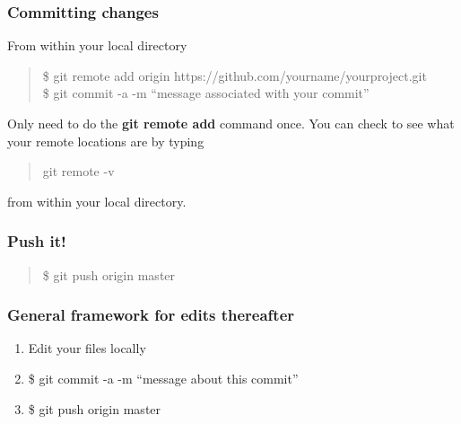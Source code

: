 \documentclass{beamer}\usepackage{graphicx, color}
\begin{document}
\begin{frame}
\frametitle{\textbf{Committing changes}}
  From within your local directory
  \begin{quote}
    \$ git remote add origin https://github.com/yourname/yourproject.git \\
    \$ git commit -a -m ``message associated with your commit''
  \end{quote}
  \pause
  Only need to do the \textbf{git remote add} command once. You can check to see what your remote locations are by typing \begin{quote}
                                                                                                                           git remote -v
                                                                                                                          \end{quote}
from within your local directory. 
\end{frame}


\begin{frame}
\frametitle{\textbf{Push it!}}
 \begin{quote}
  \$ git push origin master
 \end{quote}

\end{frame}



\begin{frame}
 \frametitle{General framework for edits thereafter}
\begin{block}{}
 \begin{enumerate}
  \item Edit your files locally
  \item \$ git commit -a -m ``message about this commit''
  \item \$ git push origin master 
 \end{enumerate}
\end{block}
\end{frame}
\end{document}
